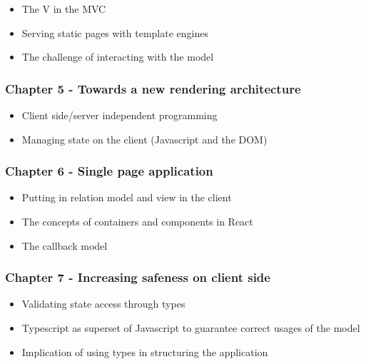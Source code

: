 \begin{itemize}
\tightlist
\item
  The V in the MVC
\item
  Serving static pages with template engines
\item
  The challenge of interacting with the model
\end{itemize}

\subsubsection{Chapter 5 - Towards a new rendering
architecture}\label{chapter-5---towards-a-new-rendering-architecture}

\begin{itemize}
\tightlist
\item
  Client side/server independent programming
\item
  Managing state on the client (Javascript and the DOM)
\end{itemize}

\subsubsection{Chapter 6 - Single page
application}\label{chapter-6---single-page-application}

\begin{itemize}
\tightlist
\item
  Putting in relation model and view in the client
\item
  The concepts of containers and components in React
\item
  The callback model
\end{itemize}

\subsubsection{Chapter 7 - Increasing safeness on client
side}\label{chapter-7---increasing-safeness-on-client-side}

\begin{itemize}
\tightlist
\item
  Validating state access through types
\item
  Typescript as superset of Javascript to guarantee correct usages of
  the model
\item
  Implication of using types in structuring the application
\end{itemize}

